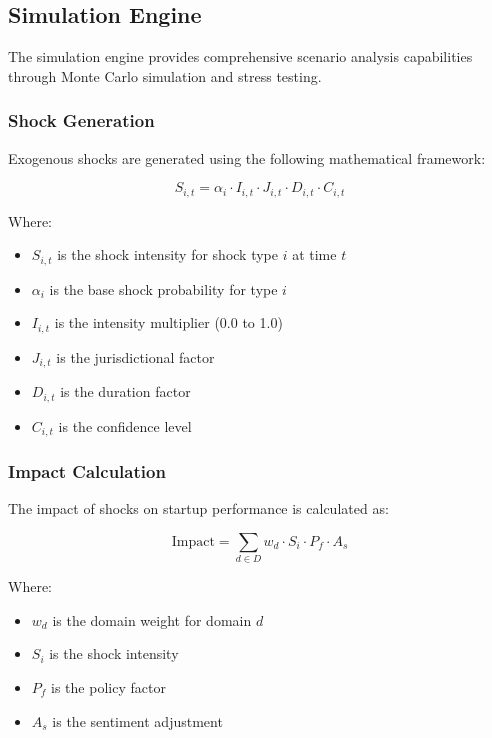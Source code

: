 \documentclass[conference]{IEEEtran}
\begin{document}
\subsection{Simulation Engine}

The simulation engine provides comprehensive scenario analysis capabilities through Monte Carlo simulation and stress testing.

\subsubsection{Shock Generation}
Exogenous shocks are generated using the following mathematical framework:

\begin{equation}
S_{i,t} = \alpha_i \cdot I_{i,t} \cdot J_{i,t} \cdot D_{i,t} \cdot C_{i,t}
\end{equation}

Where:
\begin{itemize}
    \item $S_{i,t}$ is the shock intensity for shock type $i$ at time $t$
    \item $\alpha_i$ is the base shock probability for type $i$
    \item $I_{i,t}$ is the intensity multiplier (0.0 to 1.0)
    \item $J_{i,t}$ is the jurisdictional factor
    \item $D_{i,t}$ is the duration factor
    \item $C_{i,t}$ is the confidence level
\end{itemize}

\subsubsection{Impact Calculation}
The impact of shocks on startup performance is calculated as:

\begin{equation}
\text{Impact} = \sum_{d \in D} w_d \cdot S_i \cdot P_f \cdot A_s
\end{equation}

Where:
\begin{itemize}
    \item $w_d$ is the domain weight for domain $d$
    \item $S_i$ is the shock intensity
    \item $P_f$ is the policy factor
    \item $A_s$ is the sentiment adjustment
\end{itemize}
\end{document}

